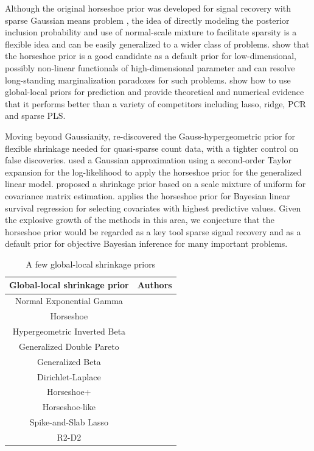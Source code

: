 \documentclass[11pt]{article}
\begin{document}
Although the original horseshoe prior was developed for signal recovery with sparse Gaussian means problem , the idea of directly modeling the posterior inclusion probability and use of normal-scale mixture to facilitate sparsity is a flexible idea and can be easily generalized to a wider class of problems. \citet{bhadra2015default} show that the horseshoe prior is a good candidate as a default prior for low-dimensional, possibly non-linear functionals of high-dimensional parameter and can resolve long-standing marginalization paradoxes for such problems. \citet{bhadra2016prediction} show how to use global-local priors for prediction and provide theoretical and numerical evidence that it performs better than a variety of competitors including lasso, ridge, PCR and sparse PLS. 

Moving beyond Gaussianity, \citet{datta2016bayesian} re-discovered the Gauss-hypergeometric prior for flexible shrinkage needed for quasi-sparse count data, with a tighter control on false discoveries. \citet{piironen2016hyperprior} used a Gaussian approximation using a second-order Taylor expansion for the log-likelihood to apply the horseshoe prior for the generalized linear model. \citet{wang2013class} proposed a shrinkage prior based on a scale mixture of uniform for covariance matrix estimation. \citet{peltola2014hierarchical} applies the horseshoe prior for Bayesian linear survival regression for selecting covariates with highest predictive values. Given the explosive growth of the methods in this area, we conjecture that the horseshoe prior would be regarded as a key tool sparse signal recovery and as a default prior for objective Bayesian inference for many important problems. 

\begin{table}[htbp]
  \centering
  \caption{A few global-local shrinkage priors}
  \footnotesize{
    \begin{tabular}{|c|c|}
    \hline
    Global-local shrinkage prior  & Authors  \bigstrut\\
    \hline
    Normal Exponential Gamma & \citet{griffin2005alternative} \bigstrut[t]\\
    Horseshoe & \citet{carvalho2010horseshoe, carvalho2009handling} \\
    Hypergeometric Inverted Beta & \citet{polson2010large} \\
    Generalized Double Pareto & \citet{armagan2011generalized} \\
    Generalized Beta  & \citet{armagan2013generalized} \\
    Dirichlet-Laplace & \citet{bhattacharya2014dirichlet} \\
    Horseshoe+  & \citet{bhadra2015horseshoe+} \\
    Horseshoe-like & \citet{bhadra2017horseshoe} \\
    Spike-and-Slab Lasso & \citet{rovckova2016spike} \\
    R2-D2 & \citet{zhang2016high} \bigstrut[b]\\
    \hline
    \end{tabular}%
    }
  \label{tab:one-gps}%
\end{table}%
\end{document}
